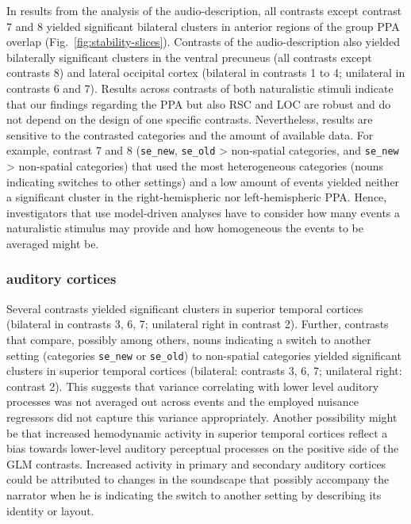 \documentclass[english]{article}
\begin{document}
In results from the analysis of the audio-description, all contrasts except
contrast 7 and 8  yielded significant bilateral clusters in anterior regions of
the group PPA overlap (Fig.~\ref{fig:stability-slices}).
Contrasts of the audio-description also yielded bilaterally significant clusters
in the ventral precuneus (all contrasts except contrasts 8) and lateral
occipital cortex (bilateral in contrasts 1 to 4; unilateral in contrasts 6 and
7).
Results across contrasts of both naturalistic stimuli indicate that our findings
regarding the PPA but also RSC and LOC are robust and do not depend on the
design of one specific contrasts.
Nevertheless, results are sensitive to the contrasted categories and the amount
of available data.
For example, contrast 7 and 8 (\texttt{se\_new}, \texttt{se\_old} > non-spatial
categories, and \texttt{se\_new} > non-spatial categories) that used the most
heterogeneous categories (nouns indicating switches to other settings) and a low
amount of events yielded neither a significant cluster in the right-hemispheric
nor left-hemispheric PPA.
Hence, investigators that use model-driven analyses have to consider how many
events a naturalistic stimulus may provide and how homogeneous the events to be
averaged might be.


\subsubsection{auditory cortices}

Several contrasts yielded significant clusters in superior temporal cortices
(bilateral in contrasts 3, 6, 7; unilateral right in contrast 2).
Further, contrasts that compare, possibly among others, nouns indicating a
switch to another setting (categories \texttt{se\_new} or \texttt{se\_old}) to
non-spatial categories yielded significant clusters in superior temporal
cortices (bilateral: contrasts 3, 6, 7; unilateral right: contrast 2).
This suggests that variance correlating with lower level auditory processes was
not averaged out across events and the employed nuisance regressors did not
capture this variance appropriately.
Another possibility might be that increased hemodynamic activity in superior
temporal cortices reflect a bias towards lower-level auditory perceptual
processes on the positive side of the GLM contrasts.
Increased activity in primary and secondary auditory cortices could be
attributed to changes in the soundscape that possibly accompany the narrator
when he is indicating the switch to another setting by describing its identity
or layout.
\end{document}
